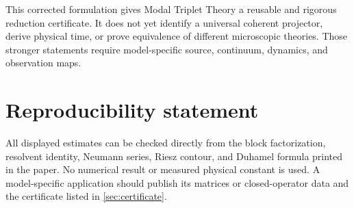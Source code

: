 \documentclass[11pt]{article}
\theoremstyle{definition}
\theoremstyle{remark}
\newcommand{\1}{\mathbf 1}
\newcommand{\MTT}{Modal Triplet Theory}
\begin{document}
This corrected formulation gives \MTT{} a reusable and rigorous reduction
certificate.  It does not yet identify a universal coherent projector,
derive physical time, or prove equivalence of different microscopic
theories.  Those stronger statements require model-specific source,
continuum, dynamics, and observation maps.

\section*{Reproducibility statement}

All displayed estimates can be checked directly from the block
factorization, resolvent identity, Neumann series, Riesz contour, and
Duhamel formula printed in the paper.  No numerical result or measured
physical constant is used.  A model-specific application should publish
its matrices or closed-operator data and the certificate listed in
\cref{sec:certificate}.



\end{document}

